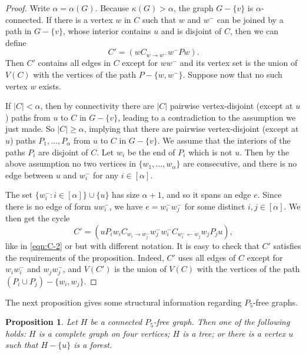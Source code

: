 \documentclass[11pt,english]{article}
\theoremstyle{plain}
\newtheorem{proposition}[theorem]{Proposition}
\theoremstyle{definition}
\theoremstyle{remark}
\def \wm {w^-}
\def \nto {\leftarrow}
\begin{document}
		\begin{proof}
			Write $\alpha = \alpha(G)$. Because $\kappa(G) > \alpha$, the graph $G - \{v\}$ is $\alpha$-connected. 
			If there is a vertex $w$ in $C$ such that $w$ and $\wm$ can be joined by a path in $G - \{v\}$, whose interior contains $u$ and is disjoint of $C$, then we can define 
			\begin{equation*}
				C' = (wC_{w \to \wm}\wm P w).
			\end{equation*}
			Then $C'$ contains all edges in $C$ except for $w \wm$ and its vertex set is the union of $V(C)$ with the vertices of the path $P - \{w,  \wm\}$. Suppose now that no such vertex $w$ exists.

			If $|C| < \alpha$, then by connectivity there are $|C|$ pairwise vertex-disjoint (except at $u$) paths from $u$ to $C$ in $G - \{v\}$, leading to a contradiction to the assumption we just made. So $|C| \ge \alpha$, implying that there are pairwise vertex-disjoint (except at $u$) paths $P_1, \ldots, P_{\alpha}$ from $u$ to $C$ in $G - \{v\}$. We assume that the interiors of the paths $P_i$ are disjoint of $C$. Let $w_i$ be the end of $P_i$ which is not $u$. Then by the above assumption no two vertices in $\{w_1, \ldots, w_{\alpha}\}$ are consecutive, and there is no edge between $u$ and $\wm_i$ for any $i \in [\alpha]$.

			The set $\{\wm_i : i \in [\alpha]\} \cup \{u\}$ has size $\alpha + 1$, and so it spans an edge $e$. Since there is no edge of form $u\wm_i$, we have $e = \wm_i \wm_j$ for some distinct $i,j \in [\alpha]$. We then get the cycle
			\begin{equation*}
				C' = (u P_i w_i C_{w_i \to \wm_j} \wm_j \wm_i C_{\wm_i \nto w_j} w_j P_j u),
			\end{equation*}
			like in \eqref{eqn:C-2} or  but with different notation.
			It is easy to check that $C'$ satisfies the requirements of the proposition. Indeed, $C'$ uses all edges of $C$ except for $w_i\wm_i$ and $w_j \wm_j$, and $V(C')$ is the union of $V(C)$ with the vertices of the path $(P_i \cup P_j) - \{w_i, w_j\}$.
		\end{proof}

		The next proposition gives some structural information regarding $P_5$-free graphs.

		\begin{proposition} \label{prop:P-5-free-structure}
			Let $H$ be a connected $P_5$-free graph. Then one of the following holds: $H$ is a complete graph on four vertices; $H$ is a tree; or there is a vertex $u$ such that $H - \{u\}$ is a forest.
		\end{proposition}
\end{document}
